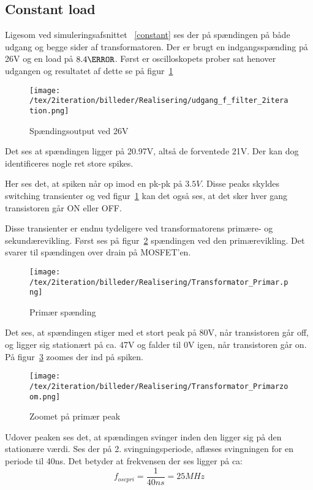 
\subsection{Constant load}
\noindent Ligesom ved simuleringsafsnittet ~\ref{constant} ses der på spændingen på både udgang og begge sider af transformatoren. Der er brugt en indgangsspænding på 26V og en load på $8.4\ohm$. 
Først er oscilloskopets prober sat henover udgangen og resultatet af dette se på figur~\ref{fig: Out26V}
\begin{figure}[H]
	\center
	\texttt{[image: /tex/2iteration/billeder/Realisering/udgang\_f\_filter\_2iteration.png]}
	\caption{Spændingsoutput ved 26V}
	\label{fig: Out26V}
\end{figure}
\noindent Det ses at spændingen ligger på 20.97V, altså de forventede 21V. Der kan dog identificeres nogle ret store spikes. 

\noindent Her ses det, at spiken når op imod en pk-pk på $3.5V$. Disse peaks skyldes switching transienter og ved figur~\ref{fig: Out26V} kan det også ses, at det sker hver gang transistoren går ON eller OFF.

\noindent Disse transienter er endnu tydeligere ved transformatorens primære- og sekundærevikling. Først ses på figur~\ref{fig: privolt} spændingen ved den primærevikling. Det svarer til spændingen over drain på MOSFET'en. 
\begin{figure}[H]
	\center
	\texttt{[image: /tex/2iteration/billeder/Realisering/Transformator\_Primar.png]}
	\caption{Primær spænding}
	\label{fig: privolt}
\end{figure}
\noindent Det ses, at spændingen stiger med et stort peak på 80V, når transistoren går off, og ligger sig stationært på ca. 47V og falder til 0V igen, når transistoren går on. På figur~\ref{fig: prizoom} zoomes der ind på spiken.
\begin{figure}[H]
	\center
	\texttt{[image: /tex/2iteration/billeder/Realisering/Transformator\_Primarzoom.png]}
	\caption{Zoomet på primær peak}
	\label{fig: prizoom}
\end{figure}
Udover peaken ses det, at spændingen svinger inden den ligger sig på den stationære værdi. Ses der på 2. svingningsperiode, aflæses svingningen for en periode til 40ns. Det betyder at frekvensen der ses ligger på ca:
\begin{equation} \label{svingpri}
f_{oscpri} = \frac{1}{40ns} = 25MHz
\end{equation}

